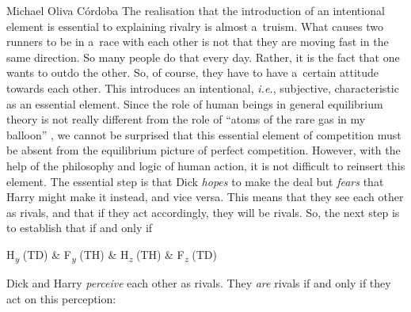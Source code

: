 \begin{artengenv}{Michael Oliva Córdoba}
The realisation that the introduction of an intentional element is essential to explaining rivalry is almost a~truism. What causes two runners to be in a~race with each other is not that they are moving fast in the same direction. So many people do that every day. Rather, it is the fact that one wants to outdo the other. So, of course, they have to have a~certain attitude towards each other. This introduces an intentional, \textit{i.e.}, subjective, characteristic as an essential element. Since the role of human beings in general equilibrium theory is not really different from the role of ``atoms of the rare gas in my balloon'' 
\parencite[][p.1411]{samuelson_modern_1966}, %
 we cannot be surprised that this essential element of competition must be absent from the equilibrium picture of perfect competition. However, with the help of the philosophy and logic of human action, it is not difficult to reinsert this element. The essential step is that Dick \textit{hopes} to make the deal but \textit{fears} that Harry might make it instead, and vice versa. This means that they see each other as rivals, and that if they act accordingly, they will be rivals. So, the next step is to establish that if and only if
\vspace{-.09cm}
\begin{description}[font=\normalfont, labelindent=0pt, leftmargin=!, labelwidth=1cm]
  \item[(PR)]  H\textit{\textsubscript{y}} (TD) \& F\textit{\textsubscript{y}} (TH) \& H\textit{\textsubscript{z}} (TH) \& F\textit{\textsubscript{z}} (TD)
\end{description}
\vspace{-.09cm}


%
%
%
%

\noindent Dick and Harry \textit{perceive} each other as rivals. They \textit{are} rivals if and only if they act on this perception:
\vspace{-.09cm}
\begin{description}[font=\normalfont, labelindent=0pt, leftmargin=!, labelwidth=1cm]
  \item[(AR)] 
\end{description}
\vspace{-.09cm}


\end{artengenv}
